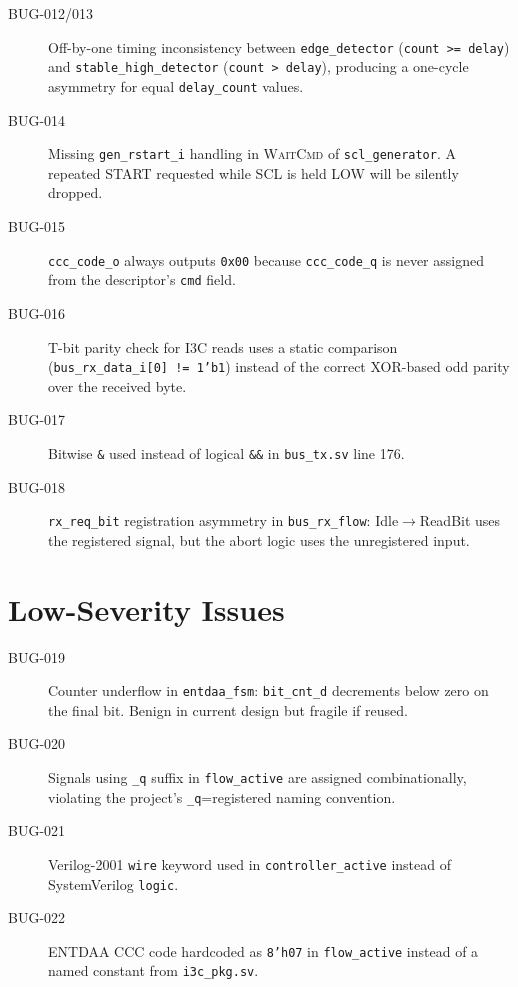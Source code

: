 \documentclass[12pt, a4paper, oneside]{report}
\newcommand{\signal}[1]{\texttt{#1}}
\newcommand{\file}[1]{\texttt{#1}}
\newcommand{\module}[1]{\texttt{#1}}
\newcommand{\state}[1]{\textsc{#1}}
\begin{document}
\begin{description}
  \item[BUG-012/013] Off-by-one timing inconsistency between \module{edge\_detector}
    (\texttt{count >= delay}) and \module{stable\_high\_detector}
    (\texttt{count > delay}), producing a one-cycle asymmetry for equal
    \signal{delay\_count} values.

  \item[BUG-014] Missing \signal{gen\_rstart\_i} handling in \state{WaitCmd} of
    \module{scl\_generator}. A repeated START requested while SCL is held LOW will
    be silently dropped.

  \item[BUG-015] \signal{ccc\_code\_o} always outputs \texttt{0x00} because
    \signal{ccc\_code\_q} is never assigned from the descriptor's \texttt{cmd} field.

  \item[BUG-016] T-bit parity check for I3C reads uses a static comparison
    (\texttt{bus\_rx\_data\_i[0] != 1'b1}) instead of the correct XOR-based odd
    parity over the received byte.

  \item[BUG-017] Bitwise \texttt{\&} used instead of logical \texttt{\&\&} in
    \module{bus\_tx.sv} line 176.

  \item[BUG-018] \signal{rx\_req\_bit} registration asymmetry in
    \module{bus\_rx\_flow}: Idle$\rightarrow$ReadBit uses the registered signal,
    but the abort logic uses the unregistered input.
\end{description}

\section{Low-Severity Issues}

\begin{description}
  \item[BUG-019] Counter underflow in \module{entdaa\_fsm}: \signal{bit\_cnt\_d}
    decrements below zero on the final bit. Benign in current design but fragile
    if reused.
  \item[BUG-020] Signals using \signal{\_q} suffix in \module{flow\_active} are
    assigned combinationally, violating the project's \signal{\_q}=registered naming
    convention.
  \item[BUG-021] Verilog-2001 \texttt{wire} keyword used in
    \module{controller\_active} instead of SystemVerilog \texttt{logic}.
  \item[BUG-022] ENTDAA CCC code hardcoded as \texttt{8'h07} in
    \module{flow\_active} instead of a named constant from \file{i3c\_pkg.sv}.
\end{description}
\end{document}
